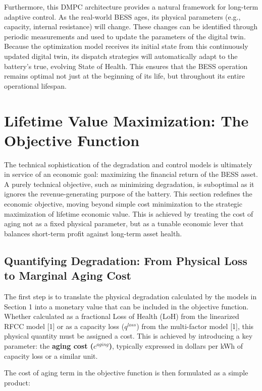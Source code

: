 Furthermore, this DMPC architecture provides a natural framework for long-term adaptive control. As the real-world BESS ages, its physical parameters (e.g., capacity, internal resistance) will change. These changes can be identified through periodic measurements and used to update the parameters of the digital twin. Because the optimization model receives its initial state from this continuously updated digital twin, its dispatch strategies will automatically adapt to the battery's true, evolving State of Health. This ensures that the BESS operation remains optimal not just at the beginning of its life, but throughout its entire operational lifespan.

\section{Lifetime Value Maximization: The Objective Function}

The technical sophistication of the degradation and control models is ultimately in service of an economic goal: maximizing the financial return of the BESS asset. A purely technical objective, such as minimizing degradation, is suboptimal as it ignores the revenue-generating purpose of the battery. This section redefines the economic objective, moving beyond simple cost minimization to the strategic maximization of lifetime economic value. This is achieved by treating the cost of aging not as a fixed physical parameter, but as a tunable economic lever that balances short-term profit against long-term asset health.

\subsection{Quantifying Degradation: From Physical Loss to Marginal Aging Cost}

The first step is to translate the physical degradation calculated by the models in Section 1 into a monetary value that can be included in the objective function. Whether calculated as a fractional Loss of Health (LoH) from the linearized RFCC model [1] or as a capacity loss ($q^{loss}$) from the multi-factor model [1], this physical quantity must be assigned a cost. This is achieved by introducing a key parameter: the \textbf{aging cost ($c^{aging}$)}, typically expressed in dollars per kWh of capacity loss or a similar unit.

The cost of aging term in the objective function is then formulated as a simple product:

